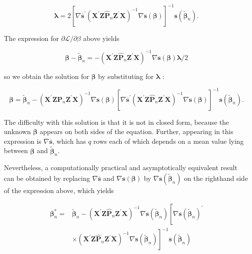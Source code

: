 \documentclass[10pt]{article}
\begin{document}
$$
\boldsymbol{\lambda}=2\left[\nabla \overline{\mathbf{s}}^{\prime}\left(\mathbf{X}^{\prime} \mathbf{Z} \hat{\mathbf{P}}_{n} \mathbf{Z}^{\prime} \mathbf{X}\right)^{-1} \nabla \mathbf{s}(\boldsymbol{\beta})\right]^{-1} \mathbf{s}\left(\tilde{\boldsymbol{\beta}}_{n}\right) .
$$

The expression for $\partial \mathcal{L} / \partial \beta$ above yields

$$
\boldsymbol{\beta}-\tilde{\boldsymbol{\beta}}_{n}=-\left(\mathbf{X}^{\prime} \mathbf{Z} \hat{\mathbf{P}}_{n} \mathbf{Z}^{\prime} \mathbf{X}\right)^{-1} \nabla \mathbf{s}(\boldsymbol{\beta}) \boldsymbol{\lambda} / 2
$$

so we obtain the solution for $\boldsymbol{\beta}$ by substituting for $\boldsymbol{\lambda}$ :

$$
\boldsymbol{\beta}=\tilde{\boldsymbol{\beta}}_{n}-\left(\mathbf{X}^{\prime} \mathbf{Z} \hat{\mathbf{P}}_{n} \mathbf{Z}^{\prime} \mathbf{X}\right)^{-1} \nabla \mathbf{s}(\boldsymbol{\beta})\left[\nabla \overline{\mathbf{s}}^{\prime}\left(\mathbf{X}^{\prime} \mathbf{Z} \hat{\mathbf{P}}_{n} \mathbf{Z}^{\prime} \mathbf{X}\right)^{-1} \nabla \mathbf{s}(\boldsymbol{\beta})\right]^{-1} \mathbf{s}\left(\tilde{\boldsymbol{\beta}}_{n}\right) .
$$

The difficulty with this solution is that it is not in closed form, because the unknown $\boldsymbol{\beta}$ appears on both sides of the equation. Further, appearing in this expression is $\nabla \overline{\mathbf{s}}$, which has $q$ rows each of which depends on a mean value lying between $\boldsymbol{\beta}$ and $\tilde{\boldsymbol{\beta}}_{n}$.

Nevertheless, a computationally practical and asymptotically equivalent result can be obtained by replacing $\nabla \overline{\mathbf{s}}$ and $\nabla \mathbf{s}(\boldsymbol{\beta})$ by $\nabla \mathbf{s}\left(\tilde{\boldsymbol{\beta}}_{n}\right)$ on the righthand side of the expression above, which yields

$$
\begin{aligned}
\boldsymbol{\beta}_{n}^{*}= & \tilde{\boldsymbol{\beta}}_{n}-\left(\mathbf{X}^{\prime} \mathbf{Z} \hat{\mathbf{P}}_{n} \mathbf{Z}^{\prime} \mathbf{X}\right)^{-1} \nabla \mathbf{s}\left(\tilde{\boldsymbol{\beta}}_{n}\right)\left[\nabla \mathbf{s}\left(\tilde{\boldsymbol{\beta}}_{n}\right)^{\prime}\right. \\
& \left.\times\left(\mathbf{X}^{\prime} \mathbf{Z} \hat{\mathbf{P}}_{n} \mathbf{Z}^{\prime} \mathbf{X}\right)^{-1} \nabla \mathbf{s}\left(\tilde{\boldsymbol{\beta}}_{n}\right)\right]^{-1} \mathbf{s}\left(\tilde{\boldsymbol{\beta}}_{n}\right)
\end{aligned}
$$
\end{document}
